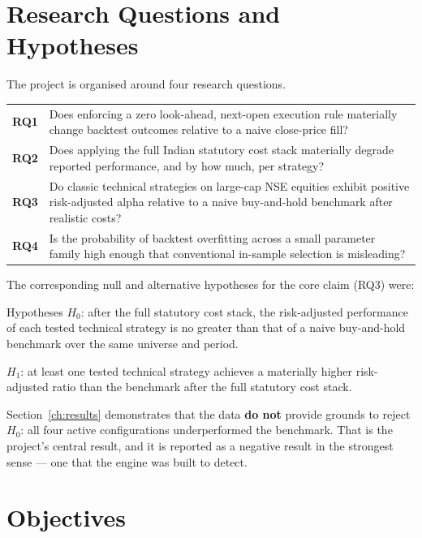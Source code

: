 \documentclass[12pt,a4paper,oneside]{report}
\begin{document}
\section{Research Questions and Hypotheses}

The project is organised around four research questions.

\begin{center}
\begin{tabular}{@{}p{1.0cm}p{11.7cm}@{}}
\toprule
\textbf{RQ1} & Does enforcing a zero look-ahead, next-open execution rule
materially change backtest outcomes relative to a naive close-price fill? \\
\textbf{RQ2} & Does applying the full Indian statutory cost stack materially
degrade reported performance, and by how much, per strategy? \\
\textbf{RQ3} & Do classic technical strategies on large-cap NSE equities exhibit
positive risk-adjusted alpha relative to a naive buy-and-hold benchmark after
realistic costs? \\
\textbf{RQ4} & Is the probability of backtest overfitting across a small
parameter family high enough that conventional in-sample selection is
misleading? \\
\bottomrule
\end{tabular}
\end{center}

The corresponding null and alternative hypotheses for the core claim (RQ3) were:

\begin{defensebox}{Hypotheses}
$H_0$: after the full statutory cost stack, the risk-adjusted performance of each
tested technical strategy is no greater than that of a naive buy-and-hold
benchmark over the same universe and period.

$H_1$: at least one tested technical strategy achieves a materially higher
risk-adjusted ratio than the benchmark after the full statutory cost stack.
\end{defensebox}

Section~\ref{ch:results} demonstrates that the data \textbf{do not} provide
grounds to reject $H_0$: all four active configurations underperformed the
benchmark. That is the project's central result, and it is reported as a
negative result in the strongest sense --- one that the engine was built to
detect.

\section{Objectives}
\end{document}
